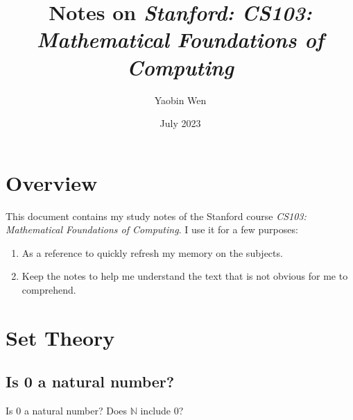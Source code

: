 \documentclass[12pt, letterpaper, oneside]{book}
\title{
  Notes on \textit{Stanford: CS103: Mathematical Foundations of Computing}
}
\author{Yaobin Wen}
\date{July 2023}
\begin{document}
\maketitle
\tableofcontents

\chapter*{Overview}

This document contains my study notes of the Stanford course \textit{CS103:
  Mathematical Foundations of Computing}. I use it for a few purposes:

\begin{enumerate}
  \item As a reference to quickly refresh my memory on the subjects.
  \item Keep the notes to help me understand the text that is not obvious for
        me to comprehend.
\end{enumerate}

%
%

\chapter{Set Theory}

\section{Is 0 a natural number?}

Is $0$ a natural number? Does $\mathbb{N}$ include $0$?
\end{document}
